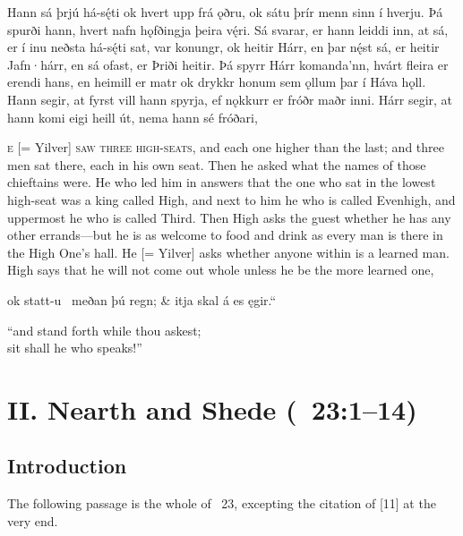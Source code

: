 \bpg\bpa[0]%
\pva[15]Hann sá þrjú há-sę́ti ok hvert upp frá ǫðru, ok sátu þrír menn sinn í hverju.
\pva Þá spurði hann, hvert nafn hǫfðingja þeira vę́ri. Sá svarar, er hann leiddi inn, at
\pva sá, er í inu neðsta há-sę́ti sat, var konungr, ok heitir Hárr, en þar nę́st sá, er heitir Jafn·hárr, en sá ofast, er Þriði heitir.
\pva Þá spyrr Hárr komanda’nn, hvárt fleira er erendi hans, en heimill er matr ok drykkr honum sem ǫllum þar í Háva hǫll.
\pva Hann segir, at fyrst vill hann spyrja, ef nǫkkurr er fróðr maðr inni.
\pva Hárr segir, at hann komi eigi heill út, nema hann sé fróðari,\epa

\bpb{}\textsc{e} [= Yilver] \textsc{saw three high-seats}, and each one higher than the last; and three men sat there, each in his own seat.
\pvb Then he asked what the names of those chieftains were.  He who led him in answers that
\pvb the one who sat in the lowest high-seat was a king called High, and next to him he who is called Evenhigh, and uppermost he who is called Third.
\pvb Then High asks the guest whether he has any other errands---but he is as welcome to food and drink as every man is there in the High One’s hall.
\pvb He [= Yilver] asks whether anyone within is a learned man.
\pvb High says that he will not come out whole unless he be the more learned one,\epb\epg

\bvg\bva{}%
ok statt-u  \hld\ meðan þú regn; &
\ind {}itja skal á es ęgir.“\eva

\bvb “and stand forth while thou askest; \\
\ind sit shall he who speaks!”\evb\evg

\sectionline

\newpage

\section{II. Nearth and Shede (\Gylfaginning~23:1--14)}\chapterStart%
%

\subsection{Introduction}

The following passage is the whole of \Gylfaginning~23, excepting the citation of [11] at the very end.

